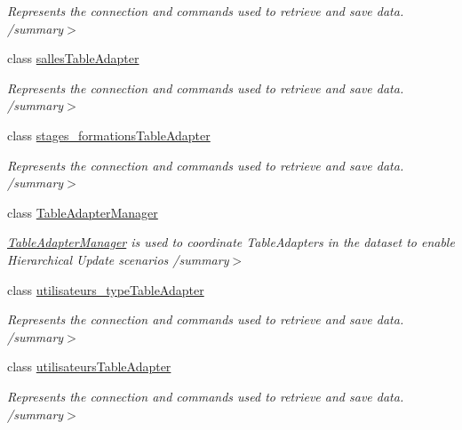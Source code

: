 \begin{DoxyCompactItemize}
\begin{DoxyCompactList}\small\item\em Represents the connection and commands used to retrieve and save data. /summary$>$ \end{DoxyCompactList}\item 
class \hyperlink{classforma_1_1formadb_data_set_table_adapters_1_1salles_table_adapter}{salles\+Table\+Adapter}
\begin{DoxyCompactList}\small\item\em Represents the connection and commands used to retrieve and save data. /summary$>$ \end{DoxyCompactList}\item 
class \hyperlink{classforma_1_1formadb_data_set_table_adapters_1_1stages__formations_table_adapter}{stages\+\_\+formations\+Table\+Adapter}
\begin{DoxyCompactList}\small\item\em Represents the connection and commands used to retrieve and save data. /summary$>$ \end{DoxyCompactList}\item 
class \hyperlink{classforma_1_1formadb_data_set_table_adapters_1_1_table_adapter_manager}{Table\+Adapter\+Manager}
\begin{DoxyCompactList}\small\item\em \hyperlink{classforma_1_1formadb_data_set_table_adapters_1_1_table_adapter_manager}{Table\+Adapter\+Manager} is used to coordinate Table\+Adapters in the dataset to enable Hierarchical Update scenarios /summary$>$ \end{DoxyCompactList}\item 
class \hyperlink{classforma_1_1formadb_data_set_table_adapters_1_1utilisateurs__type_table_adapter}{utilisateurs\+\_\+type\+Table\+Adapter}
\begin{DoxyCompactList}\small\item\em Represents the connection and commands used to retrieve and save data. /summary$>$ \end{DoxyCompactList}\item 
class \hyperlink{classforma_1_1formadb_data_set_table_adapters_1_1utilisateurs_table_adapter}{utilisateurs\+Table\+Adapter}
\begin{DoxyCompactList}\small\item\em Represents the connection and commands used to retrieve and save data. /summary$>$ \end{DoxyCompactList}\item 

\end{DoxyCompactItemize}
